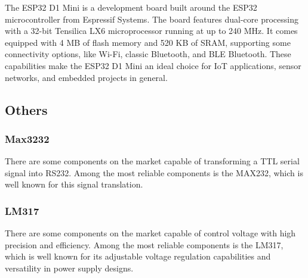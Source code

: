 \documentclass[../../monografia.tex]{subfiles}
\begin{document}
The ESP32 \cite{esp32_2024} D1 Mini is a development board built around the ESP32 microcontroller from Espressif Systems. The board features dual-core processing with a 32-bit Tensilica LX6 microprocessor running at up to 240 MHz. It comes equipped with 4 MB of flash memory and 520 KB of SRAM, supporting some connectivity options, like Wi-Fi, classic Bluetooth, and BLE Bluetooth. These capabilities make the ESP32 D1 Mini an ideal choice for IoT applications, sensor networks, and embedded projects in general.

\subsection{Others}

\subsubsection{Max3232}

There are some components on the market capable of transforming a TTL serial signal into RS232. Among the most reliable components is the MAX232, which is well known for this signal translation.

\subsubsection{LM317}

There are some components on the market capable of control voltage with high precision and efficiency. Among the most reliable components is the LM317, which is well known for its adjustable voltage regulation capabilities and versatility in power supply designs.
\end{document}
